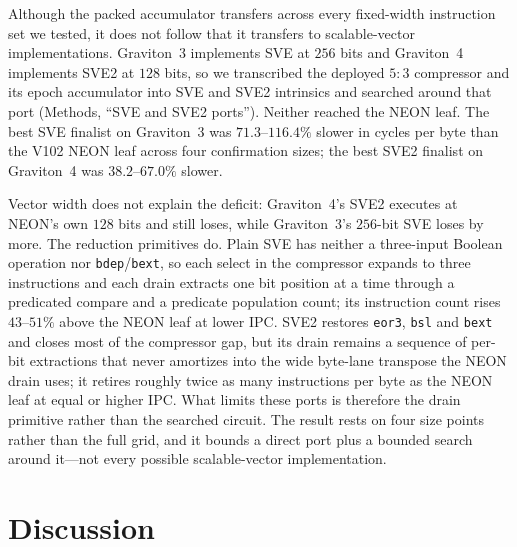 \documentclass[fleqn,10pt]{wlscirep}
\begin{document}
Although the packed accumulator transfers across every fixed-width instruction set we tested, it does not follow that it transfers to scalable-vector implementations. Graviton~3 implements SVE at $256$ bits and Graviton~4 implements SVE2 at $128$ bits, so we transcribed the deployed $5{:}3$ compressor and its epoch accumulator into SVE and SVE2 intrinsics and searched around that port (Methods, ``SVE and SVE2 ports''). Neither reached the NEON leaf. The best SVE finalist on Graviton~3 was $71.3$--$116.4\%$ slower in cycles per byte than the V102 NEON leaf across four confirmation sizes; the best SVE2 finalist on Graviton~4 was $38.2$--$67.0\%$ slower.

Vector width does not explain the deficit: Graviton~4's SVE2 executes at NEON's own $128$ bits and still loses, while Graviton~3's $256$-bit SVE loses by more. The reduction primitives do. Plain SVE has neither a three-input Boolean operation nor \texttt{bdep}/\texttt{bext}, so each select in the compressor expands to three instructions and each drain extracts one bit position at a time through a predicated compare and a predicate population count; its instruction count rises $43$--$51\%$ above the NEON leaf at lower IPC. SVE2 restores \texttt{eor3}, \texttt{bsl} and \texttt{bext} and closes most of the compressor gap, but its drain remains a sequence of per-bit extractions that never amortizes into the wide byte-lane transpose the NEON drain uses; it retires roughly twice as many instructions per byte as the NEON leaf at equal or higher IPC. What limits these ports is therefore the drain primitive rather than the searched circuit. The result rests on four size points rather than the full grid, and it bounds a direct port plus a bounded search around it---not every possible scalable-vector implementation.

\section*{Discussion}
\end{document}
